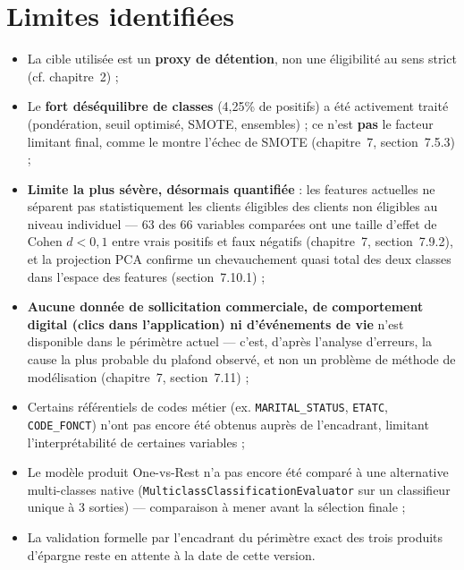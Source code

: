 \documentclass[11pt,a4paper]{report}
\begin{document}
\section{Limites identifiées}
\statutFait{}
\begin{itemize}
  \item La cible utilisée est un \textbf{proxy de détention}, non une
  éligibilité au sens strict (cf. chapitre~2) ;
  \item Le \textbf{fort déséquilibre de classes} (4,25\% de positifs) a
  été activement traité (pondération, seuil optimisé, SMOTE, ensembles) ;
  ce n'est \textbf{pas} le facteur limitant final, comme le montre
  l'échec de SMOTE (chapitre~7, section~7.5.3) ;
  \item \textbf{Limite la plus sévère, désormais quantifiée} : les
  features actuelles ne séparent pas statistiquement les clients
  éligibles des clients non éligibles au niveau individuel — 63 des 66
  variables comparées ont une taille d'effet de Cohen $d < 0,1$ entre
  vrais positifs et faux négatifs (chapitre~7, section~7.9.2), et la
  projection PCA confirme un chevauchement quasi total des deux classes
  dans l'espace des features (section~7.10.1) ;
  \item \textbf{Aucune donnée de sollicitation commerciale, de
  comportement digital (clics dans l'application) ni d'événements de vie}
  n'est disponible dans le périmètre actuel — c'est, d'après l'analyse
  d'erreurs, la cause la plus probable du plafond observé, et non un
  problème de méthode de modélisation (chapitre~7, section~7.11) ;
  \item Certains référentiels de codes métier (ex.
  \texttt{MARITAL\_STATUS}, \texttt{ETATC}, \texttt{CODE\_FONCT})
  n'ont pas encore été obtenus auprès de l'encadrant, limitant
  l'interprétabilité de certaines variables ;
  \item Le modèle produit One-vs-Rest n'a pas encore été comparé à une
  alternative multi-classes native (\texttt{MulticlassClassificationEvaluator}
  sur un classifieur unique à 3 sorties) — comparaison à mener avant la
  sélection finale ;
  \item La validation formelle par l'encadrant du périmètre exact des
  trois produits d'épargne reste en attente à la date de cette version.
\end{itemize}
\end{document}
